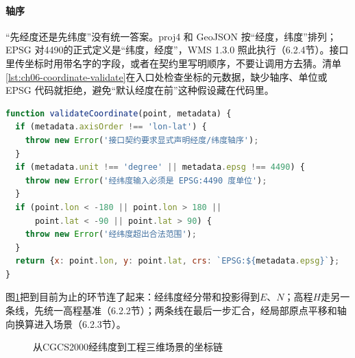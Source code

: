 \paragraph{轴序}“先经度还是先纬度”没有统一答案。proj4 和 GeoJSON 按“经度，纬度”排列；EPSG 对4490的正式定义是“纬度，经度”，WMS 1.3.0 照此执行（6.2.4节）。接口里传坐标时用带名字的字段，或者在契约里写明顺序，不要让调用方去猜。清单\ref{lst:ch06-coordinate-validate}在入口处检查坐标的元数据，缺少轴序、单位或 EPSG 代码就拒绝，避免“默认经度在前”这种假设藏在代码里。

\begin{lstlisting}[label={lst:ch06-coordinate-validate},language=JavaScript,caption={坐标元数据校验与轴序显式化}]
function validateCoordinate(point, metadata) {
  if (metadata.axisOrder !== 'lon-lat') {
    throw new Error('接口契约要求显式声明经度/纬度轴序');
  }
  if (metadata.unit !== 'degree' || metadata.epsg !== 4490) {
    throw new Error('经纬度输入必须是 EPSG:4490 度单位');
  }
  if (point.lon < -180 || point.lon > 180 ||
      point.lat < -90 || point.lat > 90) {
    throw new Error('经纬度超出合法范围');
  }
  return {x: point.lon, y: point.lat, crs: `EPSG:${metadata.epsg}`};
}
\end{lstlisting}

图\ref{fig:ch06-coordinate-chain}把到目前为止的环节连了起来：经纬度经分带和投影得到$E$、$N$；高程$H$走另一条线，先统一高程基准（6.2.2节）；两条线在最后一步汇合，经局部原点平移和轴向换算进入场景（6.2.3节）。

\begin{figure}[htbp]
\centering
{}
\caption{从CGCS2000经纬度到工程三维场景的坐标链}
\label{fig:ch06-coordinate-chain}
\end{figure}

